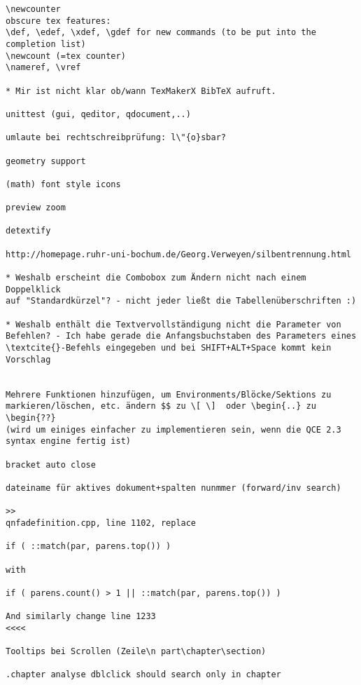 \documentclass[10pt,a4paper,landscape]{report}
\begin{document}
\begin{verbatim}
\newcounter
obscure tex features:
\def, \edef, \xdef, \gdef for new commands (to be put into the completion list)
\newcount (=tex counter)
\nameref, \vref

* Mir ist nicht klar ob/wann TexMakerX BibTeX aufruft. 

unittest (gui, qeditor, qdocument,..)

umlaute bei rechtschreibprüfung: l\"{o}sbar?

geometry support

(math) font style icons

preview zoom

detextify

http://homepage.ruhr-uni-bochum.de/Georg.Verweyen/silbentrennung.html

* Weshalb erscheint die Combobox zum Ändern nicht nach einem Doppelklick
auf "Standardkürzel"? - nicht jeder ließt die Tabellenüberschriften :)

* Weshalb enthält die Textvervollständigung nicht die Parameter von
Befehlen? - Ich habe gerade die Anfangsbuchstaben des Parameters eines
\textcite{}-Befehls eingegeben und bei SHIFT+ALT+Space kommt kein Vorschlag


Mehrere Funktionen hinzufügen, um Environments/Blöcke/Sektions zu markieren/löschen, etc. ändern $$ zu \[ \]  oder \begin{..} zu \begin{??} 
(wird um einiges einfacher zu implementieren sein, wenn die QCE 2.3 syntax engine fertig ist)

bracket auto close

dateiname für aktives dokument+spalten nunmmer (forward/inv search)

>>
qnfadefinition.cpp, line 1102, replace

if ( ::match(par, parens.top()) )

with

if ( parens.count() > 1 || ::match(par, parens.top()) )

And similarly change line 1233
<<<<

Tooltips bei Scrollen (Zeile\n part\chapter\section)

.chapter analyse dblclick should search only in chapter 


\end{verbatim}
\end{document}
